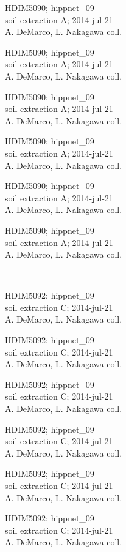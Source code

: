 \documentclass[2pt]{extarticle}
\begin{document}
\noindent
\parbox{0.16\textwidth}{\tiny \raggedright \rule[-0.3\baselineskip]{0pt}{10pt}HDIM5090; hippnet\_09\\ soil extraction A; 2014-jul-21\\ A. DeMarco, L. Nakagawa coll.}
\parbox{0.16\textwidth}{\tiny \raggedright \rule[-0.3\baselineskip]{0pt}{10pt}HDIM5090; hippnet\_09\\ soil extraction A; 2014-jul-21\\ A. DeMarco, L. Nakagawa coll.}
\parbox{0.16\textwidth}{\tiny \raggedright \rule[-0.3\baselineskip]{0pt}{10pt}HDIM5090; hippnet\_09\\ soil extraction A; 2014-jul-21\\ A. DeMarco, L. Nakagawa coll.}
\parbox{0.16\textwidth}{\tiny \raggedright \rule[-0.3\baselineskip]{0pt}{10pt}HDIM5090; hippnet\_09\\ soil extraction A; 2014-jul-21\\ A. DeMarco, L. Nakagawa coll.}
\parbox{0.16\textwidth}{\tiny \raggedright \rule[-0.3\baselineskip]{0pt}{10pt}HDIM5090; hippnet\_09\\ soil extraction A; 2014-jul-21\\ A. DeMarco, L. Nakagawa coll.}
\parbox{0.16\textwidth}{\tiny \raggedright \rule[-0.3\baselineskip]{0pt}{10pt}HDIM5090; hippnet\_09\\ soil extraction A; 2014-jul-21\\ A. DeMarco, L. Nakagawa coll.} \\ 
\vspace{0.001in} 

\noindent
\parbox{0.16\textwidth}{\tiny \raggedright \rule[-0.3\baselineskip]{0pt}{10pt}HDIM5092; hippnet\_09\\ soil extraction C; 2014-jul-21\\ A. DeMarco, L. Nakagawa coll.}
\parbox{0.16\textwidth}{\tiny \raggedright \rule[-0.3\baselineskip]{0pt}{10pt}HDIM5092; hippnet\_09\\ soil extraction C; 2014-jul-21\\ A. DeMarco, L. Nakagawa coll.}
\parbox{0.16\textwidth}{\tiny \raggedright \rule[-0.3\baselineskip]{0pt}{10pt}HDIM5092; hippnet\_09\\ soil extraction C; 2014-jul-21\\ A. DeMarco, L. Nakagawa coll.}
\parbox{0.16\textwidth}{\tiny \raggedright \rule[-0.3\baselineskip]{0pt}{10pt}HDIM5092; hippnet\_09\\ soil extraction C; 2014-jul-21\\ A. DeMarco, L. Nakagawa coll.}
\parbox{0.16\textwidth}{\tiny \raggedright \rule[-0.3\baselineskip]{0pt}{10pt}HDIM5092; hippnet\_09\\ soil extraction C; 2014-jul-21\\ A. DeMarco, L. Nakagawa coll.}
\parbox{0.16\textwidth}{\tiny \raggedright \rule[-0.3\baselineskip]{0pt}{10pt}HDIM5092; hippnet\_09\\ soil extraction C; 2014-jul-21\\ A. DeMarco, L. Nakagawa coll.} \\ 
\vspace{0.001in} 
\end{document}
